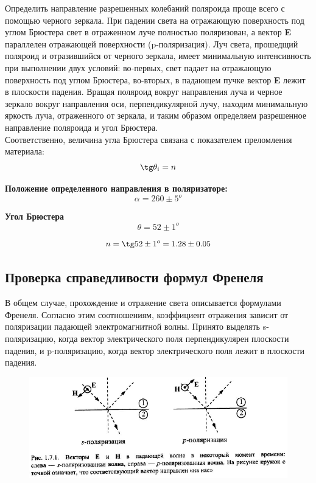 \documentclass[a4paper, 12pt]{article}
\begin{document}
Определить направление разрешенных колебаний поляроида проще всего с помощью черного зеркала. При падении света на отражающую поверхность под углом Брюстера свет в отраженном луче полностью поляризован, а вектор \textbf{E} параллелен отражающей поверхности (p-поляризация). Луч света, прошедщий поляроид и отразившийся от черного зеркала, имеет минимальную интенсивность при выполнении двух условий: во-первых, свет падает на отражающую поверхность под углом Брюстера, во-вторых, в падающем пучке вектор \textbf{E} лежит в плоскости падения. Вращая поляроид вокруг направления луча и черное зеркало вокруг направления оси, перпендикулярной лучу, находим минимальную яркость луча, отраженного от зеркала, и таким образом определяем разрешенное направление поляроида и угол Брюстера.\\

Соответственно, величина угла Брюстера связана с показателем преломления материала:
\begin{equation}
\tg \theta_i=n
\end{equation}

\textbf{Положение определенного направления в поляризаторе:}
\[\alpha = 260\pm 5^o\]

\textbf{Угол Брюстера}
\[\theta = 52\pm1^o\]

\[n = \tg 52\pm 1^o= 1.28\pm 0.05\]

		\subsection{Проверка справедливости формул Френеля}
В общем случае, прохождение и отражение света описывается формулами Френеля. Согласно этим соотношениям, коэффициент отражения зависит от поляризации падающей электромагнитной волны. Принято выделять s-поляризацию, когда вектор электрического поля перпендикулярен плоскости падения, и p-поляризацию, когда вектор электрического поля лежит в плоскости падения. 

\begin{figure}[H]
	\centering
	\includegraphics[scale=0.7]{polar}
	\caption{}
\end{figure}
\end{document}
